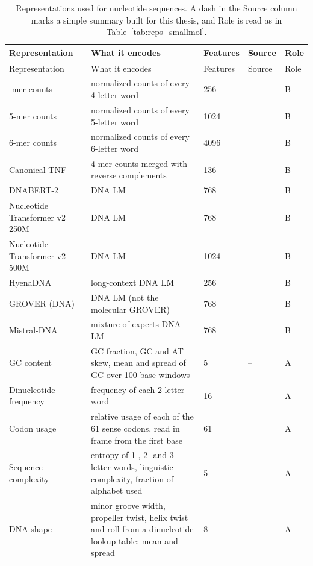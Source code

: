 {\let\small\footnotesize
\begin{longtable}{P{3.0cm}P{5.0cm}P{1.5cm}P{1.5cm}P{1.4cm}}
\caption[Representations used for nucleotide sequences.]{Representations used for nucleotide sequences. A dash in the Source column marks a simple summary built for this thesis, and Role is read as in Table~\ref{tab:reps_smallmol}.}\label{tab:reps_nucleotides}\\
\toprule
Representation & What it encodes & Features & Source & Role \\
\midrule
\endfirsthead
\toprule
Representation & What it encodes & Features & Source & Role \\
\midrule
\endhead
\bottomrule
{}-mer counts & normalized counts of every 4-letter word & 256 & \citep{Vinga2003} & B \\
5-mer counts & normalized counts of every 5-letter word & 1024 & \citep{Vinga2003} & B \\
6-mer counts & normalized counts of every 6-letter word & 4096 & \citep{Vinga2003} & B \\
Canonical TNF & 4-mer counts merged with reverse complements & 136 & \citep{Teeling2004} & B \\
DNABERT-2 & DNA LM & 768 & \citep{Zhou2023DNABERT2} & B \\
Nucleotide Transformer v2 250M & DNA LM & 768 & \citep{DallaTorre2025} & B \\
Nucleotide Transformer v2 500M & DNA LM & 1024 & \citep{DallaTorre2025} & B \\
HyenaDNA & long-context DNA LM & 256 & \citep{Nguyen2023HyenaDNA} & B \\
GROVER (DNA) & DNA LM (not the molecular GROVER) & 768 & \citep{Sanabria2024} & B \\
Mistral-DNA & mixture-of-experts DNA LM & 768 & \citep{Mourad2024} & B \\
GC content & GC fraction, GC and AT skew, mean and spread of GC over 100-base windows & 5 & -- & A \\
Dinucleotide frequency & frequency of each 2-letter word & 16 & \citep{Vinga2003} & A \\
Codon usage & relative usage of each of the 61 sense codons, read in frame from the first base & 61 & \citep{Sharp1986} & A \\
Sequence complexity & entropy of 1-, 2- and 3-letter words, linguistic complexity, fraction of alphabet used & 5 & -- & A \\
DNA shape & minor groove width, propeller twist, helix twist and roll from a dinucleotide lookup table; mean and spread & 8 & -- & A \\
\end{longtable}}

